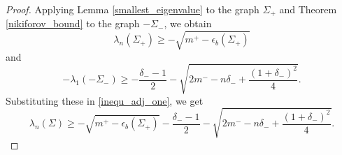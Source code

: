\documentclass[12pt]{article}
\theoremstyle{plain}
\numberwithin{equation}{section}
\begin{document}
	\begin{proof}
		
		Applying Lemma \ref{smallest_eigenvalue} to the graph $\Sigma_{+}$ and Theorem \ref{nikiforov_bound} to the graph $-\Sigma_{-}$, we obtain 
		\begin{equation}\label{Fav_Sigma+}
			\lambda_{n}(\Sigma_{+})\geq -\sqrt{m^{+}-\epsilon_{b}(\Sigma_{+})}
		\end{equation}
		and 
		\begin{equation}\label{Niki_Bound_}
			-\lambda_{1}(-\Sigma_{-})\geq -\frac{\delta_{-}-1}{2} - \sqrt{2m^{-}-n\delta_{-}+\frac{(1+\delta_{-})^2}{4}}.
		\end{equation}
		Substituting these in \eqref{inequ_adj_one}, we get
		\[\lambda_{n}(\Sigma)\geq  -\sqrt{m^{+}-\epsilon_{b}(\Sigma_{+})}-\frac{\delta_{-}-1}{2}-\sqrt{2m^{-}-n\delta_{-}+\frac{(1+\delta_{-})^{2}}{4}}.\]
		

\end{proof}
\end{document}
